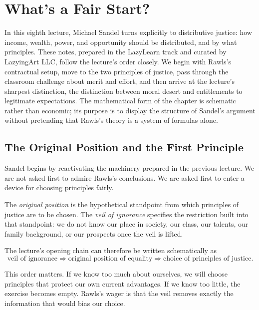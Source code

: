 \chapter{What's a Fair Start?}

In this eighth lecture, Michael Sandel turns explicitly to distributive justice: how income, wealth, power, and opportunity should be distributed, and by what principles. These notes, prepared in the LazyLearn track and curated by LazyingArt LLC, follow the lecture's order closely. We begin with Rawls's contractual setup, move to the two principles of justice, pass through the classroom challenge about merit and effort, and then arrive at the lecture's sharpest distinction, the distinction between moral desert and entitlements to legitimate expectations. The mathematical form of the chapter is schematic rather than economic; its purpose is to display the structure of Sandel's argument without pretending that Rawls's theory is a system of formulas alone.

\section{The Original Position and the First Principle}

Sandel begins by reactivating the machinery prepared in the previous lecture. We are not asked first to admire Rawls's conclusions. We are asked first to enter a device for choosing principles fairly.

\begin{definition}
The \emph{original position} is the hypothetical standpoint from which principles of justice are to be chosen. The \emph{veil of ignorance} specifies the restriction built into that standpoint: we do not know our place in society, our class, our talents, our family background, or our prospects once the veil is lifted.
\end{definition}

The lecture's opening chain can therefore be written schematically as
\begin{equation}
\text{veil of ignorance}
\Longrightarrow
\text{original position of equality}
\Longrightarrow
\text{choice of principles of justice}.
\end{equation}

This order matters. If we know too much about ourselves, we will choose principles that protect our own current advantages. If we know too little, the exercise becomes empty. Rawls's wager is that the veil removes exactly the information that would bias our choice.

